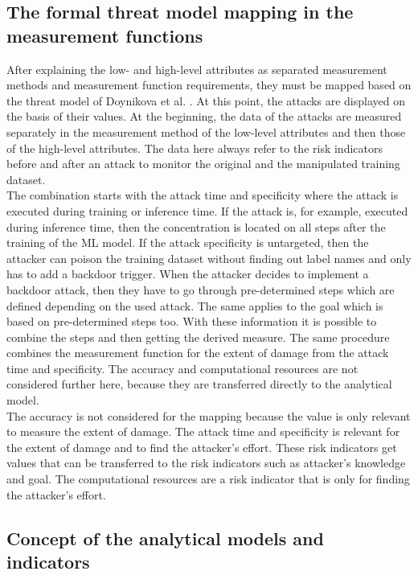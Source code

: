 \subsection{The formal threat model mapping in the measurement functions}
\label{sec:map_low_high}

After explaining the low- and high-level attributes as separated measurement methods and measurement function requirements, they must be mapped based on the threat model of Doynikova et al. \cite{DBLP:conf/crisis/DoynikovaNGK20}. At this
point, the attacks are displayed on the basis of their values. At the beginning, the data of the attacks are measured separately in the measurement method of the low-level attributes and then those of
the high-level attributes. The data here always refer to the risk indicators before and after an attack to monitor the original and the manipulated training dataset. \\
The combination starts with the attack time and specificity where the attack is executed during training or inference time. If the attack is, for example, executed during inference time, then the concentration is located on all steps after the training of the ML model. If the attack specificity is untargeted, then the attacker can poison the training dataset without finding out label names and only has to add a backdoor trigger. When the attacker decides to implement a backdoor attack, then they have to go through pre-determined steps which are defined depending on the used attack. The same applies to the goal which is based on pre-determined steps too. With these information it is possible to combine the steps and then getting the derived measure. The same procedure combines the measurement function for the extent of damage from the attack time and specificity. The accuracy and computational resources are not considered further here, because they are transferred directly to the analytical model. \\
The accuracy is not considered for the mapping because the value is only relevant to measure the extent of damage. The attack time and specificity is relevant for the extent of damage and to find the attacker's effort. These risk indicators get values that can be transferred to the risk indicators such as attacker's knowledge and goal. The computational resources are a risk indicator that is only for finding the attacker's effort.

\subsection{Concept of the analytical models and indicators}

